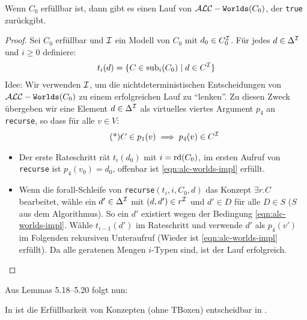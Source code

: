 \begin{lemma}
    Wenn $C_0$ erfüllbar ist, dann gibt es einen Lauf von 
    $\mathcal{A}\mathcal{L}\mathcal{C}-\texttt{Worlds}(C_0)$, der \texttt{true} zurückgibt.
    \begin{proof}
        Sei $C_0$ erfüllbar und $\mathcal{I}$ ein Modell von $C_0$ mit $d_0 \in C_0^{\mathcal{I}}$. Für jedes $d \in \Delta^{\mathcal{I}}$ und $i \geq 0$ definiere:
        \begin{align*}
            t_i(d) = \{C \in \operatorname{sub}_i(C_0) \mid d \in C^{\mathcal{I}}\}
        \end{align*}
        Idee: Wir verwenden $\mathcal{I}$, um die nichtdeterministischen Entscheidungen von $\mathcal{A}\mathcal{L}\mathcal{C}-\texttt{Worlds}(C_0)$ zu einem erfolgreichen Lauf zu \enquote{lenken}. Zu diesen Zweck übergeben wir eine Element $d \in \Delta^{\mathcal{I}}$ als virtuelles viertes Argument $p_4$ an \texttt{recurse}, so dass für alle $v \in V$:
        \begin{align*}
             \tag{*}
             \label{eqn:alc-worlds-impl}
            C \in p_1(v) \implies p_4(v) \in C^{\mathcal{I}}
        \end{align*}
        \begin{tafel}\mbox{}
            \begin{itemize}
                \item Der erste Rateschritt rät $t_i(d_0)$ mit $i = \operatorname{rd}(C_0)$,
                    im ersten Aufruf von \texttt{recurse} ist $p_4(v_0) = d_0$, offenbar ist \eqref{eqn:alc-worlds-impl} erfüllt.
                \item Wenn die forall-Schleife von \texttt{recurse}$(t_i, i, C_0, d)$ das Konzept $\exists r.C$ bearbeitet, wähle ein $d' \in \Delta^{\mathcal{I}}$ mit $(d, d') \in r^{\mathcal{I}}$ und $d' \in D$ für alle $D \in S$ ($S$ aus dem Algorithmus). So ein $d'$ existiert wegen der Bedingung \eqref{eqn:alc-worlds-impl}. Wähle $t_{i - 1}(d')$ im Rateschritt und verwende $d'$ als $p_4(v')$ im Folgenden rekursiven Unteraufruf (Wieder ist \eqref{eqn:alc-worlds-impl} erfüllt). Da alle geratenen Mengen $i$-Typen sind, ist der Lauf erfolgreich.
            \end{itemize}
        \end{tafel}
    \end{proof}
\end{lemma}

Aus Lemmas 5.18--5.20 folgt nun:
\begin{theorem}\label{thm:alc-pspace}
    In \ALC ist die Erfüllbarkeit von Konzepten (ohne TBoxen) entscheidbar in \PSpace.
\end{theorem}


